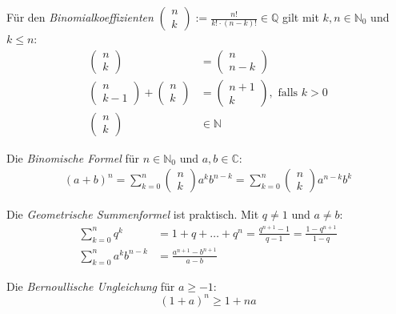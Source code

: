 \documentclass{panikzettel}
\newcommand{\N}{\mathbb{N}}
\newcommand{\Q}{\mathbb{Q}}
\begin{document}
Für den \emph{Binomialkoeffizienten} $\begin{pmatrix} n \\ k \end{pmatrix} := \frac{n!}{k! \cdot (n-k)!} \in \Q$ gilt mit $k,n \in \N_0$ und $k \leq n$:
\begin{align*}
  \begin{pmatrix} n \\ k \end{pmatrix} &= \begin{pmatrix} n \\ n - k \end{pmatrix} \\
  \begin{pmatrix} n \\ k - 1 \end{pmatrix} + \begin{pmatrix} n \\ k \end{pmatrix} &= \begin{pmatrix} n + 1 \\ k \end{pmatrix}, \text{ falls } k > 0 \\
  \begin{pmatrix} n \\ k \end{pmatrix} &\in \N
\end{align*}

Die \emph{Binomische Formel} für $n \in \N_0$ und $a,b \in \mathbb{C}$:
\begin{align*}
  (a + b)^n = \sum_{k=0}^n \begin{pmatrix} n \\ k \end{pmatrix} a^k b^{n-k} = \sum_{k=0}^n \begin{pmatrix} n \\ k \end{pmatrix} a^{n-k} b^k
\end{align*}

Die \emph{Geometrische Summenformel} ist praktisch. Mit $q \neq 1$ und $a \neq b$:
\begin{align*}
  \sum_{k=0}^n q^k &= 1 + q + \ldots + q^n = \frac{q^{n+1}-1}{q-1} = \frac{1-q^{n+1}}{1-q} \\
  \sum_{k=0}^n a^k b^{n-k} &= \frac{a^{n+1}-b^{n+1}}{a-b}
\end{align*}

Die \emph{Bernoullische Ungleichung} für $a \geq -1$:
\[
  (1+a)^n \geq 1 + na
\]
\end{document}
